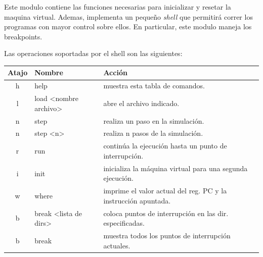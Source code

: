 \documentclass[12pt]{article}
\begin{document}
Este modulo contiene las funciones necesarias para inicializar y resetar la maquina virtual. Ademas, implementa un pequeño \textit{shell} que permitirá correr los programas con mayor control sobre ellos. En particular, este modulo maneja los breakpoints. 

Las operaciones soportadas por el shell  son las siguientes:

\begin{table}[H]
\hskip-2.0cm
\begin{tabular}{@{}cll@{}}
\toprule
\multicolumn{1}{c}{Atajo} & Nombre                                                       & Acción                                                                        \\ \midrule
h                         & help                                                         & muestra esta tabla de comandos.                                               \\
l                         & load \textless nombre archivo\textgreater                  & abre el archivo indicado.                                                     \\
n                         & step                                                         & realiza un paso en la simulación.                                             \\
n                         & step \textless n\textgreater                                  & realiza n pasos de la simulación.                                             \\
r                         & run                                                          & continúa la ejecución hasta un punto de interrupción.                         \\
i                         & init                                                         & inicializa la máquina virtual para una segunda ejecución.                     \\
w                         & where                                                        & imprime el valor actual del reg. PC y la instrucción apuntada.    \\
b                         & break \textless lista de dirs\textgreater              & coloca puntos de interrupción en las dir. especificadas.               \\
b                         & break                                                        & muestra todos los puntos de interrupción actuales.                            \\

\end{tabular}
\end{table}
\end{document}
